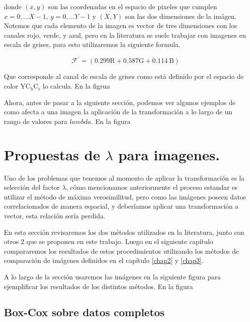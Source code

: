     donde $(x, y)$ son las coordenadas en el espacio de pixeles que cumplen $x=0, \ldots X-1$, $y=0, \ldots Y-1$ y $(X, Y)$ son las dos dimensiones de la im\'agen. Notemos que cada elemento de la imagen es vector de tres dimensiones con los canales rojo, verde, y azul, pero en la literatura se suele trabajar con imagenes en escala de grises, para esto utilizaremos la siguiente formula.

    $$
    \mathcal{F}^{\prime} =(0.299 \mathrm{R}+0.587 \mathrm{G}+0.114 \mathrm{~B})
    $$

    Que corresponde al canal de escala de grises como est\'a definido por el espacio de color $\mathrm{YC}_{\mathrm{b}} \mathrm{C}_{\mathrm{r}}$ lo calcula. En la figrua 
    
    Ahora, antes de pasar a la siguiente secci\'on, podemos ver algunos ejemplos de como afecta a una imagen la aplicaci\'on de la transformaci\'on a lo largo de un rango de valores para $lambda$. En la figura 

    \section[prpuestas de lambda]{Propuestas de $\lambda$ para imagenes.}\label{}

    Uno de los problemas que tenemos al momento de aplicar la transformaci\'on es la selecci\'on del factor $\lambda$, cómo mencionamos anteriormente el proceso estandar es utilizar el m\'etodo de m\'axima verosimilitud, pero como las im\'agenes poseen datos correlacionados de manera espacial, y deberíamos aplicar una transformaci\'on a vector, esta relaci\'on sería perdida. 

    En esta secci\'on revisaremos los dos m\'etodos utilizados en la literatura, junto con otros 2 que se proponen en este trabajo. Luego en el siguiente cap\'itulo compararemos los resultados de estos procedimientos utilizando los m\'etodos de comparaci\'on de im\'agenes definidos en el cap\'itulo \ref{chap2} y \ref{chap3}. 

    A lo largo de la secci\'on usaremos las im\'agenes en la siguiente figura para ejemplificar los resultados de los distintos m\'etodos. En la figura 


    \subsection{Box-Cox sobre datos completos}

